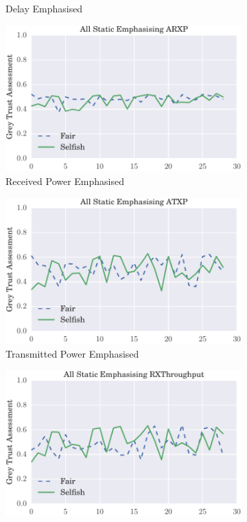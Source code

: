 \documentclass[runningheads,a4paper]{llncs}
\begin{document}
{{\begin{figure}
\begin{subfigure}{0.5\textwidth}
  \caption{Delay Emphasised}
  \label{fig:beta_trust_single}
\end{subfigure}
\begin{subfigure}{0.5\textwidth}
\centering
  \includegraphics[width=.8\linewidth]{img/trust_bella_static_emph_ARXP_SelfishTargetSelection.pdf}
  \caption{Received Power Emphasised}
  \label{fig:beta_trust_allbut1}
\end{subfigure}
\begin{subfigure}{0.5\textwidth}
\centering
  \includegraphics[width=.8\linewidth]{img/trust_bella_static_emph_ATXP_SelfishTargetSelection.pdf}
  \caption{Transmitted Power Emphasised}
  \label{fig:beta_trust_all_mobile}
\end{subfigure}
\begin{subfigure}{0.5\textwidth}
\centering
  \includegraphics[width=.8\linewidth]{img/trust_bella_static_emph_RXThroughput_SelfishTargetSelection.pdf}

\end{subfigure}
\end{figure}}}
\end{document}
